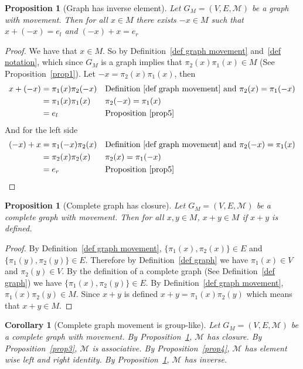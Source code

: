 \documentclass{article}
\theoremstyle{plain}
\newtheorem{proposition}[theorem]{Proposition}
\newtheorem{corollary}[theorem]{Corollary}
\theoremstyle{definition}
\begin{document}
\begin{proposition}[Graph has inverse element]\label{prop5}
	Let $G_M =(V,E,\mathcal{M})$ be a graph with movement. Then for
	all $x \in M$ there exists $-x \in M$ such that $x+(-x) = e_l$
	and $(-x)+x = e_r$
\end{proposition}
\begin{proof}
	We have that $x \in M$. So by Definition~\ref{def graph movement}
	and~\ref{def notation}, which since $G_M$ is a graph implies that
	$\pi_2(x)\pi_1(x) \in M$ (See Proposition~\ref{prop1}). Let $-x =
	\pi_2(x)\pi_1(x)$, then
	\begin{equation}
	\begin{aligned}
		x+(-x) &= \pi_1(x)\pi_2(-x) && \text{Definition~\ref{def graph
		movement} and $\pi_2(x)= \pi_1(-x)$} \\
		&= \pi_1(x)\pi_1(x) && \text{$\pi_2(-x)= \pi_1(x)$} \\
		&= e_l && \text{Proposition~\ref{prop5}} \\
	\end{aligned}
	\end{equation}
	And for the left side
	\begin{equation}
	\begin{aligned}
		(-x)+x &= \pi_1(-x)\pi_2(x) && \text{Definition~\ref{def graph
		movement} and $\pi_2(-x)= \pi_1(x)$} \\
		&= \pi_2(x)\pi_2(x) && \text{$\pi_2(x)= \pi_1(-x)$} \\
		&= e_r && \text{Proposition~\ref{prop5}} \\
	\end{aligned}
	\end{equation}
\end{proof}
\begin{proposition}[Complete graph has closure]\label{prop6}
	Let $G_M =(V,E,\mathcal{M})$ be a complete graph with
	movement. Then for all $x,y \in M$, $x+y \in M$ if $x+y$
	is defined.
\end{proposition}
\begin{proof}
	By Definition~\ref{def graph movement}, $\{\pi_1(x),\pi_2(x)\}
	\in E$ and $\{\pi_1(y),\pi_2(y)\} \in E$. Therefore by
	Definition~\ref{def graph} we have $\pi_1(x)\in V$ and
	$\pi_2(y) \in V$. By the definition of a complete graph (See
	Definition~\ref{def graph}) we have $\{\pi_1(x),\pi_2(y)\} \in
	E$. By Definition~\ref{def graph movement}, $\pi_1(x)\pi_2(y)
	\in M$. Since $x+y$ is defined $x+y=\pi_1(x)\pi_2(y)$ which
	means that $x+y\in M$.
\end{proof}
\begin{corollary}[Complete graph movement is group-like]\label{cor1}
	Let $G_M=(V,E,\mathcal{M})$ be a complete graph with movement.
	By Proposition~\ref{prop6}, $\mathcal{M}$ has closure. By
	Proposition~\ref{prop3}, $\mathcal{M}$ is associative. By
	Proposition~\ref{prop4}, $\mathcal{M}$ has element wise left
	and right identity. By Proposition~\ref{prop5}, $\mathcal{M}$
	has inverse.
\end{corollary}
\end{document}

